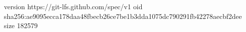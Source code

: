 version https://git-lfs.github.com/spec/v1
oid sha256:ae9095ecca178daa48fbecb26ce7be1b3dda1075dc790291fb42278aecbf2dee
size 182579
